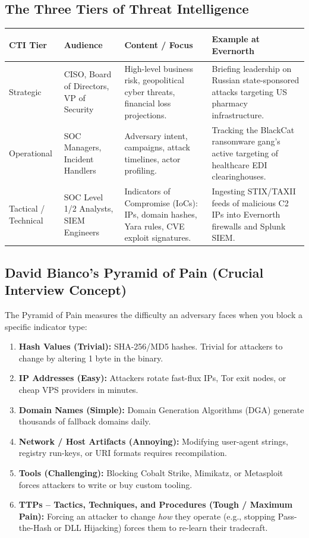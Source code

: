 \documentclass[10pt,a4paper]{article}
\begin{document}
\subsection{The Three Tiers of Threat Intelligence}
\begin{table}[h!]
\centering
\small
\begin{tabularx}{\textwidth}{>{\bfseries\raggedright\arraybackslash}p{2.6cm} >{\raggedright\arraybackslash}p{3.8cm} >{\raggedright\arraybackslash}X >{\raggedright\arraybackslash}X}
\toprule
\textbf{CTI Tier} & \textbf{Audience} & \textbf{Content / Focus} & \textbf{Example at Evernorth} \\
\midrule
Strategic & CISO, Board of Directors, VP of Security & High-level business risk, geopolitical cyber threats, financial loss projections. & Briefing leadership on Russian state-sponsored attacks targeting US pharmacy infrastructure. \\
\addlinespace
Operational & SOC Managers, Incident Handlers & Adversary intent, campaigns, attack timelines, actor profiling. & Tracking the BlackCat ransomware gang's active targeting of healthcare EDI clearinghouses. \\
\addlinespace
Tactical / Technical & SOC Level 1/2 Analysts, SIEM Engineers & Indicators of Compromise (IoCs): IPs, domain hashes, Yara rules, CVE exploit signatures. & Ingesting STIX/TAXII feeds of malicious C2 IPs into Evernorth firewalls and Splunk SIEM. \\
\bottomrule
\end{tabularx}
\end{table}

\subsection{David Bianco's Pyramid of Pain (Crucial Interview Concept)}
The Pyramid of Pain measures the difficulty an adversary faces when you block a specific indicator type:
\begin{enumerate}[noitemsep]
    \item \textbf{Hash Values (Trivial):} SHA-256/MD5 hashes. Trivial for attackers to change by altering 1 byte in the binary.
    \item \textbf{IP Addresses (Easy):} Attackers rotate fast-flux IPs, Tor exit nodes, or cheap VPS providers in minutes.
    \item \textbf{Domain Names (Simple):} Domain Generation Algorithms (DGA) generate thousands of fallback domains daily.
    \item \textbf{Network / Host Artifacts (Annoying):} Modifying user-agent strings, registry run-keys, or URI formats requires recompilation.
    \item \textbf{Tools (Challenging):} Blocking Cobalt Strike, Mimikatz, or Metasploit forces attackers to write or buy custom tooling.
    \item \textbf{TTPs -- Tactics, Techniques, and Procedures (Tough / Maximum Pain):} Forcing an attacker to change \textit{how} they operate (e.g., stopping Pass-the-Hash or DLL Hijacking) forces them to re-learn their tradecraft.
\end{enumerate}
\end{document}
